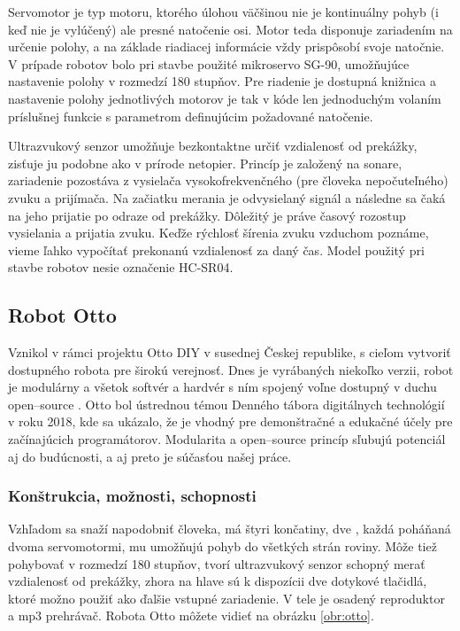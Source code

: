 Servomotor je typ motoru, ktorého úlohou väčšinou nie je kontinuálny pohyb (i keď nie je vylúčený) ale presné natočenie osi. Motor teda disponuje zariadením na určenie polohy, a na základe riadiacej informácie vždy prispôsobí svoje natočnie. V prípade robotov bolo pri stavbe použité mikroservo SG-90, umožňujúce nastavenie polohy v rozmedzí 180 stupňov. Pre riadenie je dostupná knižnica a nastavenie polohy jednotlivých motorov je tak v kóde len jednoduchým volaním príslušnej funkcie s parametrom definujúcim požadované natočenie.

Ultrazvukový senzor umožňuje bezkontaktne určiť vzdialenosť od prekážky, zisťuje ju podobne ako v prírode netopier. Princíp je založený na sonare, zariadenie pozostáva z vysielača vysokofrekvenčného (pre človeka nepočuteľného) zvuku a prijímača. Na začiatku merania je odvysielaný signál a následne sa čaká na jeho prijatie po odraze od prekážky. Dôležitý je práve časový rozostup vysielania a prijatia  zvuku. Keďže rýchlosť šírenia zvuku vzduchom poznáme, vieme ľahko vypočítať prekonanú vzdialenosť za daný čas. Model použitý pri stavbe robotov nesie označenie HC-SR04.

\subsection{Robot Otto}
Vznikol v rámci projektu Otto DIY v susednej Českej republike, s cieľom vytvoriť dostupného robota pre širokú verejnosť. Dnes je vyrábaných niekoľko verzii, robot je modulárny a všetok softvér a hardvér s ním spojený voľne dostupný v duchu open--source \cite{OttoDIY}. Otto bol ústrednou témou Denného tábora digitálnych technológií v roku 2018, kde sa ukázalo, že je vhodný pre demonštračné a edukačné účely pre začínajúcich programátorov. Modularita a open--source princíp sľubujú potenciál aj do budúcnosti, a aj preto je súčasťou našej práce.

\subsubsection{Konštrukcia, možnosti, schopnosti}
Vzhľadom sa snaží napodobniť človeka, má štyri končatiny, dve , každá poháňaná dvoma servomotormi, mu umožňujú pohyb do všetkých strán roviny. Môže tiež pohybovať  v rozmedzí 180 stupňov,  tvorí ultrazvukový senzor schopný merať vzdialenosť od prekážky, zhora na hlave sú k dispozícii dve dotykové tlačidlá, ktoré možno použiť ako ďalšie vstupné zariadenie. V tele je osadený reproduktor a mp3 prehrávač. Robota Otto môžete vidieť na obrázku \ref{obr:otto}.

